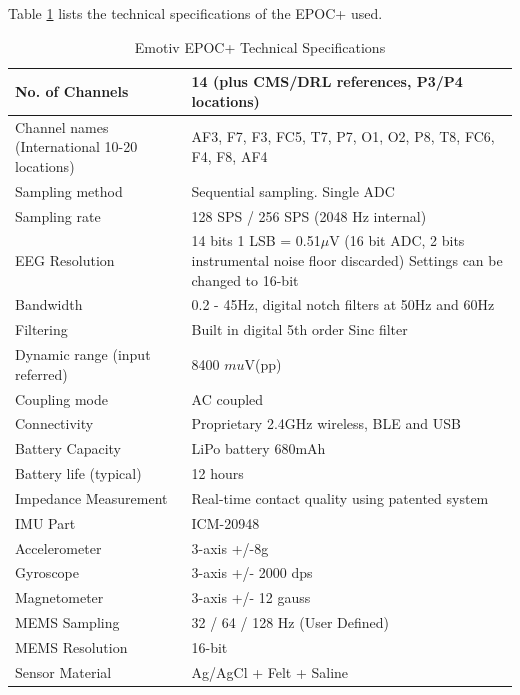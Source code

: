 \documentclass{article}
\begin{document}
Table \ref{tab:Emotiv Specs} lists the technical specifications of the EPOC+ used.
\begin{table}[htbp]
    \centering
    \begin{tabular}{|p{7cm}|p{7cm}|}
        \hline
         No. of Channels & 14 (plus CMS/DRL references, P3/P4 locations) \\ [1ex]
        \hline
         Channel names (International 10-20 locations) & AF3, F7, F3, FC5, T7, P7, O1, O2, P8, T8, FC6, F4, F8, AF4 \\[1ex]
        \hline
         Sampling method & Sequential sampling. Single ADC \\ [1ex]
        \hline
         Sampling rate & 128 SPS / 256 SPS (2048 Hz internal) \\ [1ex]
        \hline
         EEG Resolution & 14 bits 1 LSB = 0.51$\mu$V (16 bit ADC, 2 bits instrumental noise floor discarded) Settings can be changed to 16-bit  \\ [1ex]
        \hline
         Bandwidth & 0.2 - 45Hz, digital notch filters at 50Hz and 60Hz \\ [1ex]
        \hline
         Filtering & Built in digital 5th order Sinc filter \\ [1ex]
        \hline
         Dynamic range (input referred) & 8400 $mu$V(pp) \\ [1ex]
        \hline
         Coupling mode & AC coupled \\ [1ex]
        \hline
         Connectivity & Proprietary 2.4GHz wireless, BLE and USB \\ [1ex]
        \hline
         Battery Capacity & LiPo battery 680mAh \\ [1ex]
        \hline
         Battery life (typical) & 12 hours \\ [1ex]
        \hline
         Impedance Measurement & Real-time contact quality using patented system \\ [1ex]
        \hline
         IMU Part & ICM-20948 \\ [1ex]
        \hline
         Accelerometer & 3-axis +/-8g \\ [1ex]
        \hline
         Gyroscope & 3-axis +/- 2000 dps \\ [1ex]
        \hline
         Magnetometer & 3-axis +/- 12 gauss \\ [1ex]
        \hline
         MEMS Sampling & 32 / 64 / 128 Hz (User Defined) \\ [1ex]
        \hline
         MEMS Resolution & 16-bit \\ [1ex]
        \hline
         Sensor Material & Ag/AgCl + Felt + Saline \\ [1ex]
         \hline
    \end{tabular}
    \caption{Emotiv EPOC+ Technical Specifications}
    \label{tab:Emotiv Specs}
\end{table}
 
\end{document}
